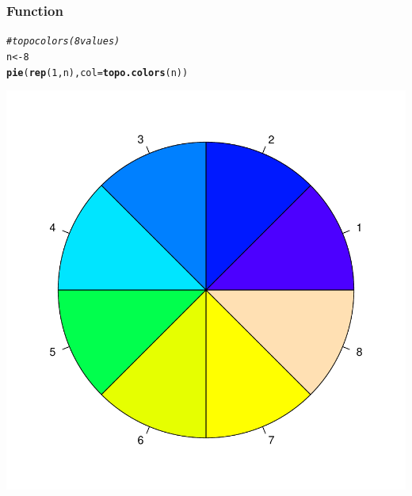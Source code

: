 \documentclass[12pt]{beamer}\usepackage[]{graphicx}\usepackage[]{color}
\makeatletter
\newcommand{\hlnum}[1]{\textcolor[rgb]{0.686,0.059,0.569}{#1}}%
\newcommand{\hlcom}[1]{\textcolor[rgb]{0.678,0.584,0.686}{\textit{#1}}}%
\newcommand{\hlstd}[1]{\textcolor[rgb]{0.345,0.345,0.345}{#1}}%
\newcommand{\hlkwb}[1]{\textcolor[rgb]{0.69,0.353,0.396}{#1}}%
\newcommand{\hlkwc}[1]{\textcolor[rgb]{0.333,0.667,0.333}{#1}}%
\newcommand{\hlkwd}[1]{\textcolor[rgb]{0.737,0.353,0.396}{\textbf{#1}}}%
\newenvironment{kframe}{%
 \def\at@end@of@kframe{}%
 \ifinner\ifhmode%
  \def\at@end@of@kframe{\end{minipage}}%
  \begin{minipage}{\columnwidth}%
 \fi\fi%
 \def\FrameCommand##1{\hskip\@totalleftmargin \hskip-\fboxsep
 \colorbox{shadecolor}{##1}\hskip-\fboxsep
     \hskip-\linewidth \hskip-\@totalleftmargin \hskip\columnwidth}%
 \MakeFramed {\advance\hsize-\width
   \@totalleftmargin\z@ \linewidth\hsize
   \@setminipage}}%
 {\par\unskip\endMakeFramed%
 \at@end@of@kframe}
\newenvironment{knitrout}{}{} %
\makeatother
\begin{document}
\begin{frame}[fragile]
\frametitle{Function }

\begin{knitrout}\scriptsize
{}\color{fgcolor}\begin{kframe}
\begin{alltt}
\hlcom{# topo colors (8 values)}
\hlstd{n} \hlkwb{<-} \hlnum{8}
\hlkwd{pie}\hlstd{(}\hlkwd{rep}\hlstd{(}\hlnum{1}\hlstd{, n),} \hlkwc{col} \hlstd{=} \hlkwd{topo.colors}\hlstd{(n))}
\end{alltt}
\end{kframe}

{\centering \includegraphics[width=.4\linewidth,height=.4\linewidth]{figure/topocolors-1} 

}



\end{knitrout}

\end{frame}

\end{document}
